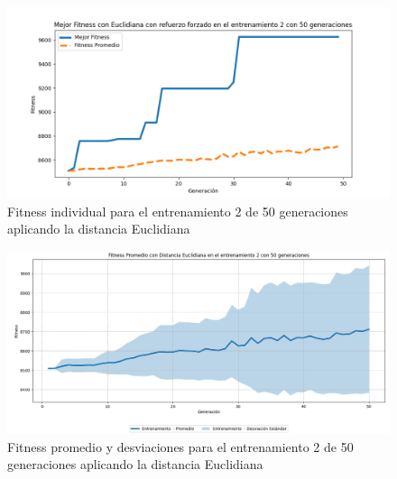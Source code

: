 \documentclass[conference]{IEEEtran}
\begin{document}
\begin{figure}[H]
    \centering
    \includegraphics[width=0.9 \linewidth]{Euclidiana/Fitnes_individual/Fitness_2_Eucli_50Gen.png}
    \caption{Fitness individual para el entrenamiento 2 de 50 generaciones aplicando la distancia Euclidiana}
    \label{fig:eucli_2_50}
\end{figure}
\begin{figure}[H]
    \centering
    \includegraphics[width=0.9 \linewidth]{Euclidiana/Fitnes_individual/Fitness_2_Eucli_50Gen_Sombra.png}
    \caption{Fitness promedio y desviaciones para el entrenamiento 2 de 50 generaciones aplicando la distancia Euclidiana}
    \label{fig:eucli_2_50_sombra}
\end{figure}
\end{document}
